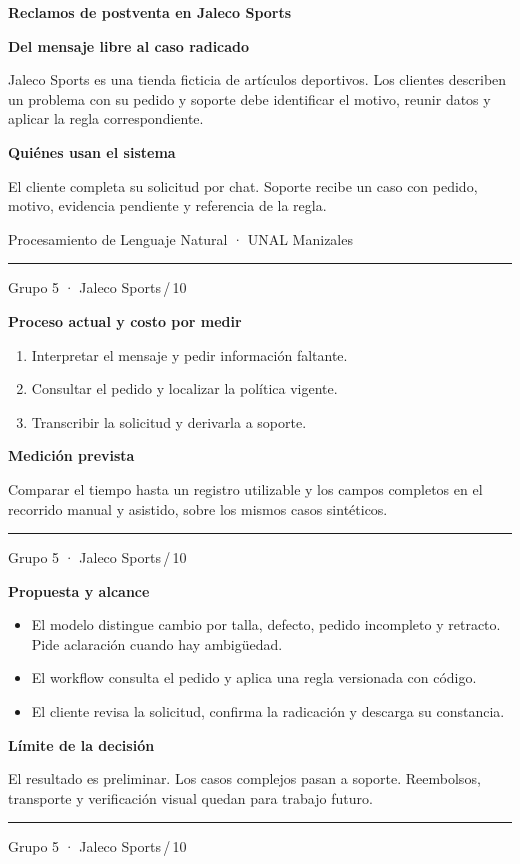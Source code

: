 \documentclass[11pt]{article}
\newenvironment{slide}[1]{%
  \thispagestyle{empty}%
  \begin{minipage}[t][0.97\textheight][t]{\textwidth}%
  \begingroup\setlength{\fboxsep}{6pt}%
  \colorbox{Pino}{\parbox{\dimexpr\linewidth-2\fboxsep\relax}{\color{white}\Large\bfseries #1}}%
  \endgroup\par\medskip
}{%
  \par\vfill\hrule\smallskip
  {\scriptsize Grupo 5 · Jaleco Sports\hfill\thepage\,/\,10}\par
  \end{minipage}\newpage
}
\newenvironment{block}[1]{%
  \par\medskip\textcolor{Mineral}{\bfseries #1}\par\smallskip
}{\par\medskip}
\begin{document}
\begin{slide}{Reclamos de postventa en Jaleco Sports}
  {\LARGE\bfseries Del mensaje libre al caso radicado}\par\medskip
  Jaleco Sports es una tienda ficticia de artículos deportivos. Los clientes describen un problema con su pedido y soporte debe identificar el motivo, reunir datos y aplicar la regla correspondiente.
  \begin{block}{Quiénes usan el sistema}
    El cliente completa su solicitud por chat. Soporte recibe un caso con pedido, motivo, evidencia pendiente y referencia de la regla.
  \end{block}
  \medskip Procesamiento de Lenguaje Natural · UNAL Manizales
\end{slide}

\begin{slide}{Proceso actual y costo por medir}
  \begin{enumerate}
    \item Interpretar el mensaje y pedir información faltante.
    \item Consultar el pedido y localizar la política vigente.
    \item Transcribir la solicitud y derivarla a soporte.
  \end{enumerate}
  \begin{block}{Medición prevista}
    Comparar el tiempo hasta un registro utilizable y los campos completos en el recorrido manual y asistido, sobre los mismos casos sintéticos.
  \end{block}
\end{slide}

\begin{slide}{Propuesta y alcance}
  \begin{itemize}
    \item El modelo distingue cambio por talla, defecto, pedido incompleto y retracto. Pide aclaración cuando hay ambigüedad.
    \item El workflow consulta el pedido y aplica una regla versionada con código.
    \item El cliente revisa la solicitud, confirma la radicación y descarga su constancia.
  \end{itemize}
  \begin{block}{Límite de la decisión}
    El resultado es preliminar. Los casos complejos pasan a soporte. Reembolsos, transporte y verificación visual quedan para trabajo futuro.
  \end{block}
\end{slide}
\end{document}
